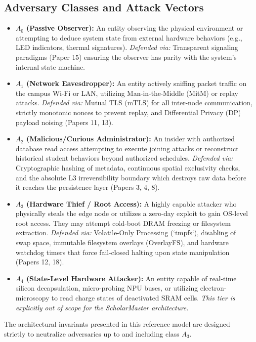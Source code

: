 \documentclass[conference]{IEEEtran}
\theoremstyle{definition}
\begin{document}
\subsection{Adversary Classes and Attack Vectors}
\begin{itemize}
    \item \textbf{$A_0$ (Passive Observer):} An entity observing the physical environment or attempting to deduce system state from external hardware behaviors (e.g., LED indicators, thermal signatures). \textit{Defended via:} Transparent signaling paradigms (Paper 15) ensuring the observer has parity with the system's internal state machine.
    \item \textbf{$A_1$ (Network Eavesdropper):} An entity actively sniffing packet traffic on the campus Wi-Fi or LAN, utilizing Man-in-the-Middle (MitM) or replay attacks. \textit{Defended via:} Mutual TLS (mTLS) for all inter-node communication, strictly monotonic nonces to prevent replay, and Differential Privacy (DP) payload noising (Papers 11, 13).
    \item \textbf{$A_2$ (Malicious/Curious Administrator):} An insider with authorized database read access attempting to execute joining attacks or reconstruct historical student behaviors beyond authorized schedules. \textit{Defended via:} Cryptographic hashing of metadata, continuous spatial exclusivity checks, and the absolute L3 irreversibility boundary which destroys raw data before it reaches the persistence layer (Papers 3, 4, 8).
    \item \textbf{$A_3$ (Hardware Thief / Root Access):} A highly capable attacker who physically steals the edge node or utilizes a zero-day exploit to gain OS-level root access. They may attempt cold-boot DRAM freezing or filesystem extraction. \textit{Defended via:} Volatile-Only Processing (`tmpfs`), disabling of swap space, immutable filesystem overlays (OverlayFS), and hardware watchdog timers that force fail-closed halting upon state manipulation (Papers 12, 18).
    \item \textbf{$A_4$ (State-Level Hardware Attacker):} An entity capable of real-time silicon decapsulation, micro-probing NPU buses, or utilizing electron-microscopy to read charge states of deactivated SRAM cells. \textit{This tier is explicitly out of scope for the ScholarMaster architecture.}
\end{itemize}

The architectural invariants presented in this reference model are designed strictly to neutralize adversaries up to and including class $A_3$.
\end{document}
